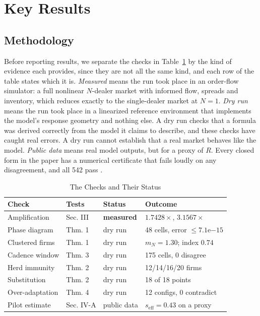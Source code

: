 \documentclass[conference]{IEEEtran}
\theoremstyle{definition}
\newcommand{\seff}{s_{\mathrm{eff}}}
\begin{document}
\section{Key Results}\label{sec:results}

\subsection{Methodology}
Before reporting results, we separate the checks in Table~\ref{tab:checks} by
the kind of evidence each provides, since they are not all the same kind, and
each row of the table states which it is. \emph{Measured} means the run took
place in an order-flow simulator: a full nonlinear $N$-dealer market with
informed flow, spreads and inventory, which reduces exactly to the
single-dealer market at $N = 1$. \emph{Dry run} means the run took place in a
linearized reference environment that implements the model's response geometry
and nothing else. A dry run checks that a formula was derived correctly from
the model it claims to describe, and these checks have caught real errors. A
dry run cannot establish that a real market behaves like the model.
\emph{Public data} means real model outputs, but for a proxy of $R$. Every closed form in
the paper has a numerical certificate that fails loudly on any disagreement,
and all 542 pass \cite{price2026}.

\begin{table}[t]
  \caption{The Checks and Their Status}
  \label{tab:checks}
  \centering
  \footnotesize
  \setlength{\tabcolsep}{4pt}
  \begin{tabular}{@{}llll@{}}
    \toprule
    Check & Tests & Status & Outcome \\
    \midrule
    Amplification   & Sec. III   & \textbf{measured} & $1.7428\times$, $3.1567\times$ \\
    Phase diagram   & Thm. 1     & dry run & 48 cells, error $\le 7.1\mathrm{e}{-15}$ \\
    Clustered firms & Thm. 1     & dry run & $m_N = 1.30$; index $0.74$ \\
    Cadence window  & Thm. 3     & dry run & 175 cells, 0 disagree \\
    Herd immunity   & Thm. 2     & dry run & 12/14/16/20 firms \\
    Substitution    & Thm. 2     & dry run & 18 of 18 points \\
    Over-adaptation & Thm. 4     & dry run & 12 configs, 0 contradict \\
    Pilot estimate  & Sec. IV-A  & public data & $\seff = 0.43$ on a proxy \\
    \bottomrule
  \end{tabular}
\end{table}
\end{document}
